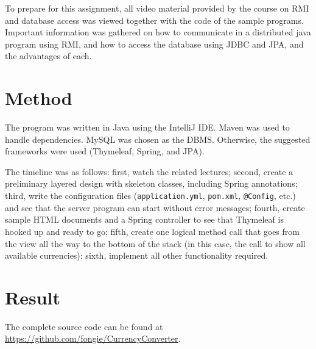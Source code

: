 \documentclass[a4paper]{scrartcl}
\def\code#1{\texttt{#1}}
\begin{document}
To prepare for this assignment, all video material provided by the course on RMI and database access was viewed together with the code of the sample programs. Important information was gathered on how to communicate in a distributed java program using RMI, and how to access the database using JDBC and JPA, and the advantages of each.

\section{Method}

\noindent The program was written in Java using the IntelliJ IDE. Maven was used to handle dependencies. MySQL was chosen as the DBMS. Otherwise, the suggested frameworks were used (Thymeleaf, Spring, and JPA).

The timeline was as follows: first, watch the related lectures; second, create a preliminary layered design with skeleton classes, including Spring annotations; third, write the configuration files (\code{application.yml}, \code{pom.xml}, \code{@Config}, etc.) and see that the server program can start without error messages; fourth, create sample HTML documents and a Spring controller to see that Thymeleaf is hooked up and ready to go; fifth, create one logical method call that goes from the view all the way to the bottom of the stack (in this case, the call to show all available currencies); sixth, implement all other functionality required. 

\section{Result}

\noindent The complete source code can be found at \href{https://github.com/fongie/CurrencyConverter}{https://github.com/fongie/CurrencyConverter}.
\end{document}
